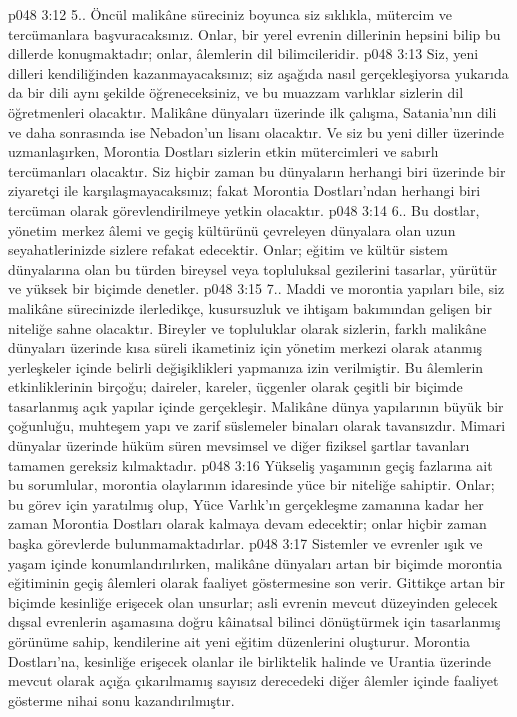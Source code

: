 \vs p048 3:12 5.\bibnobreakspace {}. Öncül malikâne süreciniz boyunca siz sıklıkla, mütercim ve tercümanlara başvuracaksınız. Onlar, bir yerel evrenin dillerinin hepsini bilip bu dillerde konuşmaktadır; onlar, âlemlerin dil bilimcileridir.
\vs p048 3:13 Siz, yeni dilleri kendiliğinden kazanmayacaksınız; siz aşağıda nasıl gerçekleşiyorsa yukarıda da bir dili aynı şekilde öğreneceksiniz, ve bu muazzam varlıklar sizlerin dil öğretmenleri olacaktır. Malikâne dünyaları üzerinde ilk çalışma, Satania’nın dili ve daha sonrasında ise Nebadon’un lisanı olacaktır. Ve siz bu yeni diller üzerinde uzmanlaşırken, Morontia Dostları sizlerin etkin mütercimleri ve sabırlı tercümanları olacaktır. Siz hiçbir zaman bu dünyaların herhangi biri üzerinde bir ziyaretçi ile karşılaşmayacaksınız; fakat Morontia Dostları’ndan herhangi biri tercüman olarak görevlendirilmeye yetkin olacaktır.
\vs p048 3:14 6.\bibnobreakspace {}. Bu dostlar, yönetim merkez âlemi ve geçiş kültürünü çevreleyen dünyalara olan uzun seyahatlerinizde sizlere refakat edecektir. Onlar; eğitim ve kültür sistem dünyalarına olan bu türden bireysel veya topluluksal gezilerini tasarlar, yürütür ve yüksek bir biçimde denetler.
\vs p048 3:15 7.\bibnobreakspace {}. Maddi ve morontia yapıları bile, siz malikâne sürecinizde ilerledikçe, kusursuzluk ve ihtişam bakımından gelişen bir niteliğe sahne olacaktır. Bireyler ve topluluklar olarak sizlerin, farklı malikâne dünyaları üzerinde kısa süreli ikametiniz için yönetim merkezi olarak atanmış yerleşkeler içinde belirli değişiklikleri yapmanıza izin verilmiştir. Bu âlemlerin etkinliklerinin birçoğu; daireler, kareler, üçgenler olarak çeşitli bir biçimde tasarlanmış açık yapılar içinde gerçekleşir. Malikâne dünya yapılarının büyük bir çoğunluğu, muhteşem yapı ve zarif süslemeler binaları olarak tavansızdır. Mimari dünyalar üzerinde hüküm süren mevsimsel ve diğer fiziksel şartlar tavanları tamamen gereksiz kılmaktadır.
\vs p048 3:16 Yükseliş yaşamının geçiş fazlarına ait bu sorumlular, morontia olaylarının idaresinde yüce bir niteliğe sahiptir. Onlar; bu görev için yaratılmış olup, Yüce Varlık’ın gerçekleşme zamanına kadar her zaman Morontia Dostları olarak kalmaya devam edecektir; onlar hiçbir zaman başka görevlerde bulunmamaktadırlar.
\vs p048 3:17 Sistemler ve evrenler ışık ve yaşam içinde konumlandırılırken, malikâne dünyaları artan bir biçimde morontia eğitiminin geçiş âlemleri olarak faaliyet göstermesine son verir. Gittikçe artan bir biçimde kesinliğe erişecek olan unsurlar; asli evrenin mevcut düzeyinden gelecek dışsal evrenlerin aşamasına doğru kâinatsal bilinci dönüştürmek için tasarlanmış görünüme sahip, kendilerine ait yeni eğitim düzenlerini oluşturur. Morontia Dostları’na, kesinliğe erişecek olanlar ile birliktelik halinde ve Urantia üzerinde mevcut olarak açığa çıkarılmamış sayısız derecedeki diğer âlemler içinde faaliyet gösterme nihai sonu kazandırılmıştır.
